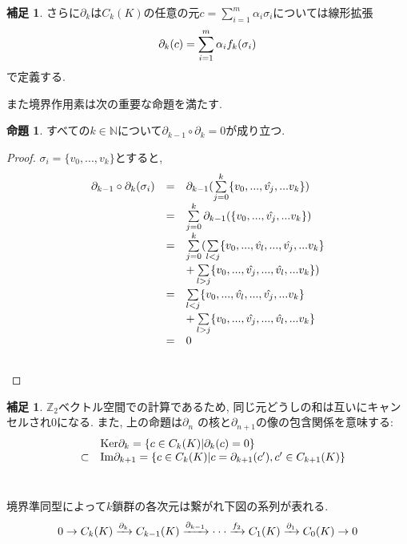 \documentclass[a4paper]{jsarticle}
\theoremstyle{definition}
\newtheorem{prop}[dfn]{命題}
\newtheorem{hsk}[dfn]{補足}
\newcommand{\Ker}{{\mathrm{Ker}}}
\newcommand{\Image}{{\mathrm{Im}}}
\begin{document}
\begin{hsk}
    さらに$\partial_k$は$C_k(K)$の任意の元$c=\sum_{i=1}^{m}\alpha_i\sigma_i$については線形拡張 
\begin{equation}
    \partial_k(c)=\sum_{i=1}^{m}\alpha_if_k(\sigma_i)\notag
\end{equation}
で定義する.\\
\end{hsk}
  また境界作用素は次の重要な命題を満たす. 
\begin{prop}
    すべての$k\in\mathbb{N}$について$\partial_{k-1}\circ \partial_k=0$が成り立つ. 
\end{prop}
\begin{proof}
    $\sigma_i=\{v_0,...,v_k\}$とすると, 
\begin{equation}
    \begin{array}{lll}
       \partial_{k-1}\circ \partial_k(\sigma_i)  & = & \partial_{k-1}(\sum\limits_{j=0}^{k} \{v_0,...,\hat{v_j},...v_k\})\\
         & = & \sum\limits_{j=0}^{k}  \partial_{k-1}(\{v_0,...,\hat{v_j},...v_k\})\\
         & = & \sum\limits_{j=0}^{k}  (\sum\limits_{l<j}^{} \{v_0,...,\hat{v_l},...,\hat{v_j},...v_k\}\\
         & & +\sum\limits_{l>j}^{} \{v_0,...,\hat{v_j},...,\hat{v_l},...v_k\})\\
         & = & \sum\limits_{l<j}^{} \{v_0,...,\hat{v_l},...,\hat{v_j},...v_k\}\\
         & & +\sum\limits_{l>j}^{} \{v_0,...,\hat{v_j},...,\hat{v_l},...v_k\}\\
         & = & 0 \notag
    \end{array}
\end{equation} \\
\end{proof}
\begin{hsk}
    $\mathbb{Z}_2$ベクトル空間での計算であるため, 同じ元どうしの和は互いにキャンセルされ0になる. また, 上の命題は$\partial_n$ の核と$\partial_{n+1}$の像の包含関係を意味する:
\begin{equation}
    \begin{array}{lll}
        &  & \Ker \partial_k =\{c \in C_k(K)| \partial_k(c)=0\}\\
         & \subset & \Image \partial_{k+1} = \{c \in C_k(K)| c= \partial_{k+1}(c'), c'\in C_{k+1}(K)\}\notag
    \end{array}
\end{equation}\\
\end{hsk}
境界準同型によって$k$鎖群の各次元は繋がれ下図の系列が表れる. 
\begin{equation}
    0\rightarrow C_k(K)\xrightarrow[]{\partial_k} C_{k-1}(K)\xrightarrow[]{\partial_{k-1}}\cdot\cdot\cdot\xrightarrow[]{f_2} C_1(K)\xrightarrow[]{\partial_1} C_0(K)\rightarrow 0\notag
\end{equation}
\end{document}
